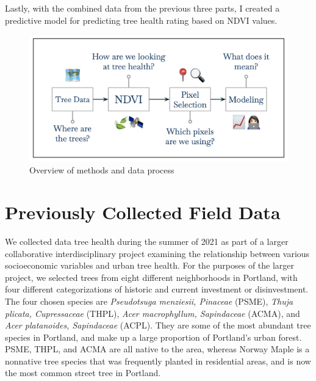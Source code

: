 \documentclass[12pt,twoside]{reedthesis}
\begin{document}
Lastly, with the combined data from the previous three parts, I created a predictive model for predicting tree health rating based on NDVI values.
\begin{figure}
\includegraphics[width=0.95\linewidth]{figure/methods-overview} \caption{Overview of methods and data process}\label{fig:unnamed-chunk-2}
\end{figure}
\hypertarget{previously-collected-field-data}{%
\section{Previously Collected Field Data}\label{previously-collected-field-data}}

We collected data tree health during the summer of 2021 as part of a larger collaborative interdisciplinary project examining the relationship between various socioeconomic variables and urban tree health. For the purposes of the larger project, we selected trees from eight different neighborhoods in Portland, with four different categorizations of historic and current investment or disinvestment. The four chosen species are \emph{Pseudotsuga menziesii, Pinaceae} (PSME), \emph{Thuja plicata, Cupressaceae} (THPL), \emph{Acer macrophyllum, Sapindaceae} (ACMA), and \emph{Acer platanoides, Sapindaceae} (ACPL). They are some of the most abundant tree species in Portland, and make up a large proportion of Portland's urban forest. PSME, THPL, and ACMA are all native to the area, whereas Norway Maple is a nonnative tree species that was frequently planted in residential areas, and is now the most common street tree in Portland.
\end{document}
